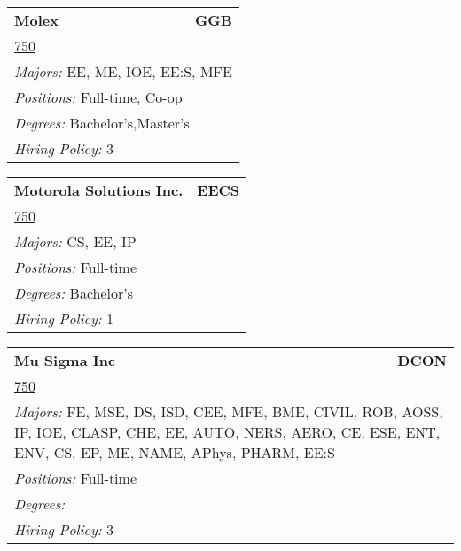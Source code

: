 \documentclass[twoside]{article}
\begin{document}
\begin{center}
\begin{multicols}{3}
\begin{FlushLeft}
\begin{minipage}{.9\columnwidth}\begin{tabularx}{.95\columnwidth}{Xr}
                 {\Large\bf Molex} & {\Large\bf GGB}\\
    \multicolumn{2}{p{.95\columnwidth}}{\url{750}}\\
    \multicolumn{2}{p{.95\columnwidth}}{\emph{Majors:} EE, ME, IOE, EE:S, MFE}\\
    \multicolumn{2}{p{.95\columnwidth}}{\emph{Positions:} Full-time, Co-op}\\
    \multicolumn{2}{p{.95\columnwidth}}{\emph{Degrees:} Bachelor's,Master's}\\
    \multicolumn{2}{p{.95\columnwidth}}{\emph{Hiring Policy:} 3}\\
    \end{tabularx}
    
\end{minipage}
 
\begin{minipage}{.9\columnwidth}\begin{tabularx}{.95\columnwidth}{Xr}
                 {\Large\bf Motorola Solutions Inc.} & {\Large\bf EECS}\\
    \multicolumn{2}{p{.95\columnwidth}}{\url{750}}\\
    \multicolumn{2}{p{.95\columnwidth}}{\emph{Majors:} CS, EE, IP}\\
    \multicolumn{2}{p{.95\columnwidth}}{\emph{Positions:} Full-time}\\
    \multicolumn{2}{p{.95\columnwidth}}{\emph{Degrees:} Bachelor's}\\
    \multicolumn{2}{p{.95\columnwidth}}{\emph{Hiring Policy:} 1}\\
    \end{tabularx}
    
\end{minipage}
 
\begin{minipage}{.9\columnwidth}\begin{tabularx}{.95\columnwidth}{Xr}
                 {\Large\bf Mu Sigma Inc} & {\Large\bf DCON}\\
    \multicolumn{2}{p{.95\columnwidth}}{\url{750}}\\
    \multicolumn{2}{p{.95\columnwidth}}{\emph{Majors:} FE, MSE, DS, ISD, CEE, MFE, BME, CIVIL, ROB, AOSS, IP, IOE, CLASP, CHE, EE, AUTO, NERS, AERO, CE, ESE, ENT, ENV, CS, EP, ME, NAME, APhys, PHARM, EE:S}\\
    \multicolumn{2}{p{.95\columnwidth}}{\emph{Positions:} Full-time}\\
    \multicolumn{2}{p{.95\columnwidth}}{\emph{Degrees:} }\\
    \multicolumn{2}{p{.95\columnwidth}}{\emph{Hiring Policy:} 3}\\
    \end{tabularx}
    

\end{minipage}
\end{FlushLeft}
\end{multicols}
\end{center}
\end{document}
